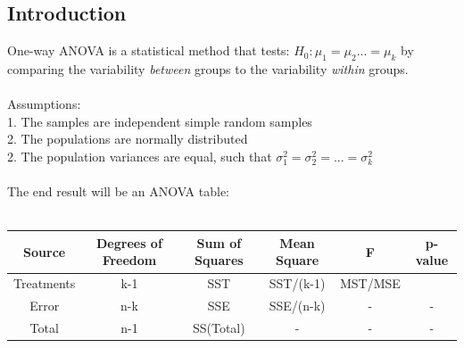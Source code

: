 \documentclass[12pt, a4paper]{article}
\begin{document}
	\subsection{Introduction}
	One-way ANOVA is a statistical method that tests: $H_0: \mu_1 = \mu_2 ... = \mu_k$ by comparing the variability \textit{between} groups to the variability \textit{within} groups. \\~\\
	Assumptions: \\
	1. The samples are independent simple random samples \\
	2. The populations are normally distributed \\
	2. The population variances are equal, such that $\sigma_1^2 = \sigma_2^2 = ... = \sigma_k^2$ \\~\\
	The end result will be an ANOVA table: \\~\\
	\begin{tabular}{ |c|c|c|c|c|c| }
		\hline
		Source & Degrees of Freedom & Sum of Squares & Mean Square & F & p-value \\ \hline
		Treatments & k-1 & SST & SST/(k-1) & MST/MSE & \\
		Error & n-k & SSE & SSE/(n-k) & - & - \\
		Total & n-1 & SS(Total) & - & - & - \\
		\hline
	\end{tabular} \\~\\
	
\end{document}
